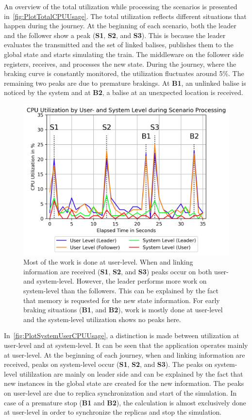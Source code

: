 An overview of the total  utilization while processing the scenarios is presented in~\autoref{fig:PlotTotalCPUUsage}.
The total  utilization reflects different situations that happen during the journey.
At the beginning of each scenario, both the leader and the follower show a peak (\textbf{S1}, \textbf{S2}, and \textbf{S3}).
This is because the leader evaluates the transmitted  and the set of linked balises, publishes them to the global state and starts simulating the train.
The middleware on the follower side registers, receives, and processes the new state.
During the journey, where the braking curve is constantly monitored, the utilization fluctuates around 5\%.
The remaining two peaks are due to premature brakings.
At \textbf{B1}, an unlinked balise is noticed by the system and at \textbf{B2}, a balise at an unexpected location is received.

\begin{figure}[!hbt]
	\centering
	\includegraphics[width=0.8\linewidth]{images/plots/SystemUserCPUUsage}
	\caption{Most of the  work is done at user-level. When  and linking information are received (\textbf{S1}, \textbf{S2}, and \textbf{S3}) peaks occur on both user- and system-level. However, the leader performs more work on system-level than the followers. This can be explained by the fact that memory is requested for the new state information. For early braking situations (\textbf{B1}, and \textbf{B2}), work is mostly done at user-level and the system-level utilization shows no peaks here.}
	\label{fig:PlotSystemUserCPUUsage}
\end{figure}

In~\autoref{fig:PlotSystemUserCPUUsage}, a distinction is made between  utilization at user-level and at system-level.
It can be seen that the application operates mainly at user-level.
At the beginning of each journey, when  and linking information are received, peaks on system-level occur (\textbf{S1}, \textbf{S2}, and \textbf{S3}).
The peaks on system-level utililzation are mainly on leader side and can be explained by the fact that new instances in the global state are created for the new information.
The peaks on user-level are due to replica synchronization and start of the simulation.
In case of a premature stop (\textbf{B1} and \textbf{B2}), the calculation is almost exclusively done at user-level in order to synchronize the replicas and stop the simulation.

